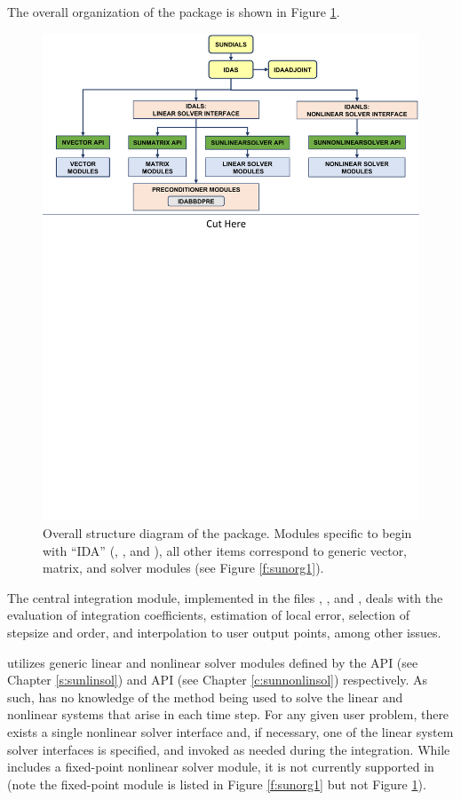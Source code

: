 The overall organization of the {\idas} package is shown in Figure
\ref{f:idasorg}.
\begin{figure}[!htb]
{\centerline{\includegraphics[width=\textwidth]{idasorg}}}
\caption [Overall structure diagram of the {\idas} package]
{Overall structure diagram of the {\idas} package.
  Modules specific to {\idas} begin with ``IDA'' ({\idals}, {\idanls}, and
  {\idabbdpre}), all other items correspond to generic
  {\sundials} vector, matrix, and solver modules (see Figure \ref{f:sunorg1}).}
\label{f:idasorg}
\end{figure}
The central integration module, implemented in the files ,
, and , deals with the evaluation of integration
coefficients, estimation of local error,
selection of stepsize and order, and interpolation to user output
points, among other issues.

{\idas} utilizes generic linear and nonlinear solver modules defined by the
{\sunlinsol} API (see Chapter \ref{s:sunlinsol}) and {\sunnonlinsol} API (see
Chapter \ref{c:sunnonlinsol}) respectively. As such, {\idas} has no knowledge
of the method being used to solve the linear and nonlinear systems that
arise in each time step. For any given user problem, there exists a single
nonlinear solver interface and, if necessary, one of the linear system solver
interfaces is specified, and invoked as needed during the integration. While
{\sundials} includes a fixed-point nonlinear solver module, it is not currently
supported in {\idas} (note the fixed-point module is listed in Figure
\ref{f:sunorg1} but not Figure \ref{f:idasorg}).


